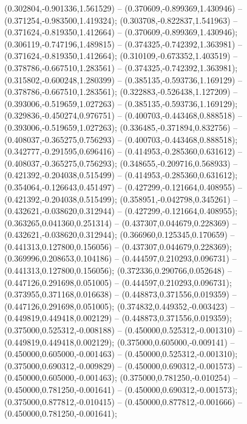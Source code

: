  (0.302804,-0.901336,1.561529) -- (0.370609,-0.899369,1.430946) -- (0.371254,-0.983500,1.419324);
 (0.303708,-0.822837,1.541963) -- (0.371624,-0.819350,1.412664) -- (0.370609,-0.899369,1.430946);
 (0.306119,-0.747196,1.489815) -- (0.374325,-0.742392,1.363981) -- (0.371624,-0.819350,1.412664);
 (0.310109,-0.673352,1.403519) -- (0.378786,-0.667510,1.283561) -- (0.374325,-0.742392,1.363981);
 (0.315802,-0.600248,1.280399) -- (0.385135,-0.593736,1.169129) -- (0.378786,-0.667510,1.283561);
 (0.322883,-0.526438,1.127209) -- (0.393006,-0.519659,1.027263) -- (0.385135,-0.593736,1.169129);
 (0.329836,-0.450274,0.976751) -- (0.400703,-0.443468,0.888518) -- (0.393006,-0.519659,1.027263);
 (0.336485,-0.371894,0.832756) -- (0.408037,-0.365275,0.756293) -- (0.400703,-0.443468,0.888518);
 (0.342777,-0.291595,0.696416) -- (0.414953,-0.285360,0.631612) -- (0.408037,-0.365275,0.756293);
 (0.348655,-0.209716,0.568933) -- (0.421392,-0.204038,0.515499) -- (0.414953,-0.285360,0.631612);
 (0.354064,-0.126643,0.451497) -- (0.427299,-0.121664,0.408955) -- (0.421392,-0.204038,0.515499);
 (0.358951,-0.042798,0.345261) -- (0.432621,-0.038620,0.312944) -- (0.427299,-0.121664,0.408955);
 (0.363265,0.041360,0.251314) -- (0.437307,0.044679,0.228369) -- (0.432621,-0.038620,0.312944);
 (0.366960,0.125345,0.170659) -- (0.441313,0.127800,0.156056) -- (0.437307,0.044679,0.228369);
 (0.369996,0.208653,0.104186) -- (0.444597,0.210293,0.096731) -- (0.441313,0.127800,0.156056);
 (0.372336,0.290766,0.052648) -- (0.447126,0.291698,0.051005) -- (0.444597,0.210293,0.096731);
 (0.373955,0.371168,0.016638) -- (0.448873,0.371556,0.019359) -- (0.447126,0.291698,0.051005);
 (0.374832,0.449352,-0.003423) -- (0.449819,0.449418,0.002129) -- (0.448873,0.371556,0.019359);
 (0.375000,0.525312,-0.008188) -- (0.450000,0.525312,-0.001310) -- (0.449819,0.449418,0.002129);
 (0.375000,0.605000,-0.009141) -- (0.450000,0.605000,-0.001463) -- (0.450000,0.525312,-0.001310);
 (0.375000,0.690312,-0.009829) -- (0.450000,0.690312,-0.001573) -- (0.450000,0.605000,-0.001463);
 (0.375000,0.781250,-0.010254) -- (0.450000,0.781250,-0.001641) -- (0.450000,0.690312,-0.001573);
 (0.375000,0.877812,-0.010415) -- (0.450000,0.877812,-0.001666) -- (0.450000,0.781250,-0.001641);
